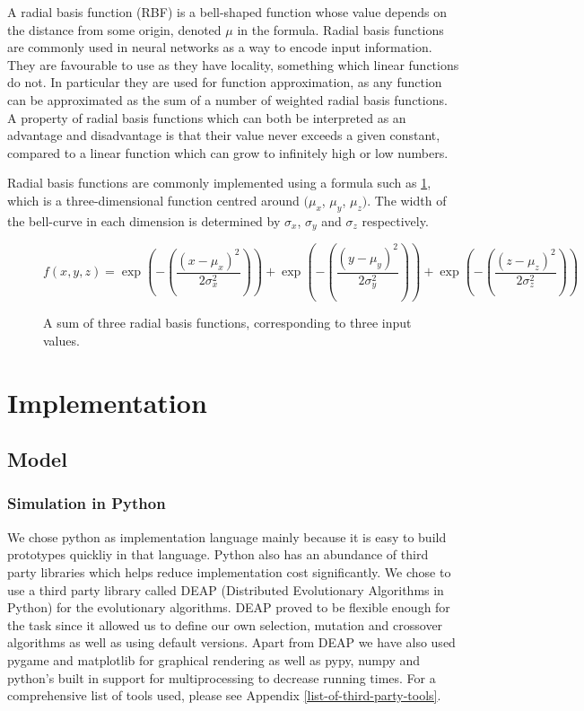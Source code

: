 \documentclass[a4paper,11pt]{kth-mag}
\begin{document}
A radial basis function (RBF) is a bell-shaped function whose value depends on the distance from some origin, denoted $\mu$ in the formula.  Radial basis functions are commonly used in neural networks as a way to encode input information. They are favourable to use as they have locality, something which linear functions do not. In particular they are used for function approximation, as any function can be approximated as the sum of a number of weighted radial basis functions. A property of radial basis functions which can both be interpreted as an advantage and disadvantage is that their value never exceeds a given constant, compared to a linear function which can grow to infinitely high or low numbers.

Radial basis functions are commonly implemented using a formula such as \ref{RBF_1}, which is a three-dimensional function centred around $(\mu _{x}$, $\mu _{y}$, $\mu _{z})$. The width of the bell-curve in each dimension is determined by $\sigma _{x}$, $\sigma _{y}$ and $\sigma _{z}$ respectively.

\begin{figure}
\begin{equation}
f(x,y,z) = \exp(-(\frac{(x-\mu_{x})^{2}}{2 \sigma _{x}^{2}})) + \exp(-(\frac{(y-\mu_{y})^{2}}{2 \sigma _{y}^{2}})) + \exp(-(\frac{(z-\mu_{z})^{2}}{2 \sigma _{z}^{2}}))
\end{equation}
\caption{A sum of three radial basis functions, corresponding to three input values.\label{RBF_1}}
\end{figure}

\chapter{Implementation}
\section{Model}
\subsection{Simulation in Python}

We chose python as implementation language mainly because it is easy to build prototypes quickliy in that language. Python also has an abundance of third party libraries which helps reduce implementation cost significantly. We chose to use a third party library called DEAP (Distributed Evolutionary Algorithms in Python) for the evolutionary algorithms. DEAP proved to be flexible enough for the task since it allowed us to define our own selection, mutation and crossover algorithms as well as using default versions. Apart from DEAP we have also used pygame and matplotlib for graphical rendering as well as pypy, numpy and python's built in support for multiprocessing to decrease running times. For a comprehensive list of tools used, please see Appendix \ref{list-of-third-party-tools}.
\end{document}
